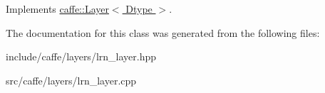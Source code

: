 Implements \hyperlink{classcaffe_1_1Layer_ad9d391b972c769c0ebee34ca6d1c973e}{caffe\+::\+Layer$<$ Dtype $>$}.



The documentation for this class was generated from the following files\+:\begin{DoxyCompactItemize}
\item 
include/caffe/layers/lrn\+\_\+layer.\+hpp\item 
src/caffe/layers/lrn\+\_\+layer.\+cpp\end{DoxyCompactItemize}
